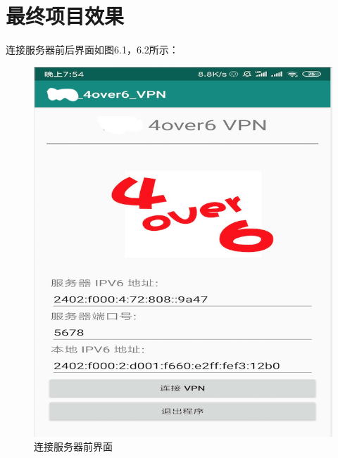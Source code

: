 \section{最终项目效果}
连接服务器前后界面如图6.1，6.2所示：
\begin{figure}[!ht]
	\begin{center}
	\includegraphics[scale=.58]{connect1.png}
	\end{center}
	\caption{连接服务器前界面}
	\label{figure:连接服务器前界面}
\end{figure}

